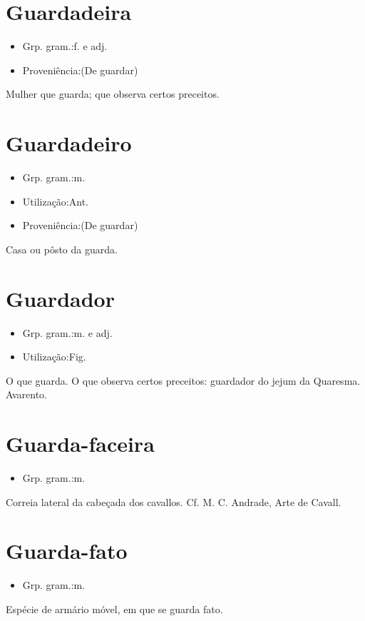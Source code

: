 \section{Guardadeira}
\begin{itemize}
\item {Grp. gram.:f.  e  adj.}
\end{itemize}
\begin{itemize}
\item {Proveniência:(De \textunderscore guardar\textunderscore )}
\end{itemize}
Mulher que guarda; que observa certos preceitos.
\section{Guardadeiro}
\begin{itemize}
\item {Grp. gram.:m.}
\end{itemize}
\begin{itemize}
\item {Utilização:Ant.}
\end{itemize}
\begin{itemize}
\item {Proveniência:(De \textunderscore guardar\textunderscore )}
\end{itemize}
Casa ou pôsto da guarda.
\section{Guardador}
\begin{itemize}
\item {Grp. gram.:m.  e  adj.}
\end{itemize}
\begin{itemize}
\item {Utilização:Fig.}
\end{itemize}
O que guarda.
O que observa certos preceitos: \textunderscore guardador do jejum da Quaresma\textunderscore .
Avarento.
\section{Guarda-faceira}
\begin{itemize}
\item {Grp. gram.:m.}
\end{itemize}
Correia lateral da cabeçada dos cavallos. Cf. M. C. Andrade, \textunderscore Arte de Cavall.\textunderscore 
\section{Guarda-fato}
\begin{itemize}
\item {Grp. gram.:m.}
\end{itemize}
Espécie de armário móvel, em que se guarda fato.
